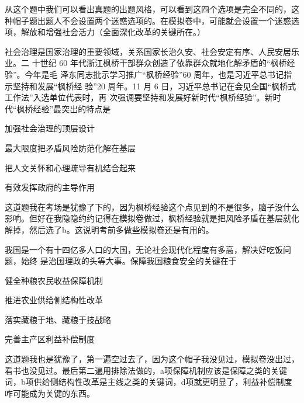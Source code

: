 \documentclass[lang=cn,newtx,10pt,scheme=chinese,pad,twocol]{zznote}
\begin{document}
\begin{postulate}
	从这个题中我们可以看出真题的出题风格，可以看到这四个选项是完全不同的，这种帽子题出题人不会设置两个迷惑选项的。在模拟卷中，可能就会设置一个迷惑选项，解放和增强社会活力（全面深化改革的关键所在。）
\end{postulate}

\begin{exercise}社会治理是国家治理的重要领域，关系国家长治久安、社会安定有序、人民安居乐业。二 十世纪 60 年代浙江枫桥干部群众创造了依靠群众就地化解矛盾的“枫桥经验”。今年是毛 泽东同志批示学习推广“枫桥经验”60 周年，也是习近平总书记指示坚持和发展“枫桥经 验”20 周年。11 月 6 日，习近平总书记在会见全国“枫桥式工作法”入选单位代表时，再 次强调要坚持和发展好新时代“枫桥经验”。新时代“枫桥经验”最突出的特点是
	\begin{choice}
		\item 加强社会治理的顶层设计
		\item 最大限度把矛盾风险防范化解在基层
		\item 把人文关怀和心理疏导有机结合起来
		\item 有效发挥政府的主导作用
	\end{choice}
\end{exercise}
\begin{solution}
	这道题我在考场是犹豫了下的，因为枫桥经验这个点见到的不是很多，脑子没什么影响。但好在我隐隐约约记得在模拟卷做过，枫桥经验就是把风险矛盾在基层就化解掉，然后选了b。这说明考前多做些模拟卷还是有用的。
\end{solution}


\begin{exercise}我国是一个有十四亿多人口的大国，无论社会现代化程度有多高，解决好吃饭问题，始终 是治国理政的头等大事。保障我国粮食安全的关键在于
	\begin{choice}
		\item 健全种粮农民收益保障机制
		\item 推进农业供给侧结构性改革
		\item 落实藏粮于地、藏粮于技战略
		\item 完善主产区利益补偿制度
	\end{choice}
\end{exercise}
\begin{solution}
	这道题我也是犹豫了，第一遍空过去了，因为这个帽子我没见过，模拟卷没出过，看书也没见过。最后第二遍用排除法做的，a项保障机制应该是保障之类的关键词，b项供给侧结构性改革是主线之类的关键词，d项就更明显了，利益补偿制度咋可能成为关键的东西。
\end{solution}
\end{document}
